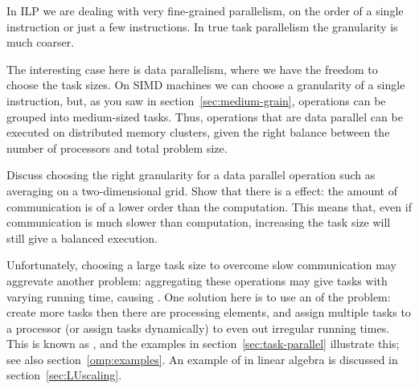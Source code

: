 In \ac{ILP} we are dealing with very fine-grained parallelism, on the
order of a single instruction or just a few instructions. In true task
parallelism the granularity is much coarser.

The interesting case here is data parallelism, where we have the
freedom to choose the task sizes. On \ac{SIMD} machines we can choose
a granularity of a single instruction, but, as you saw in
section~\ref{sec:medium-grain}, operations can be grouped into
medium-sized tasks. Thus, operations that are data parallel can be
executed on distributed memory clusters, given the right balance
between the number of processors and total problem size.

\begin{exercise}
  Discuss choosing the right granularity for a data parallel operation
  such as averaging on a two-dimensional grid. Show that there is a
   effect: the amount of communication is
  of a lower order than the computation. This means that, even if
  communication is much slower than computation, increasing the task
  size will still give a balanced execution.
\end{exercise}

Unfortunately, choosing a large task size to overcome slow
communication may aggrevate another problem: aggregating these
operations may give tasks with varying running time, causing
.  One solution here is to use an
 of the problem: create more tasks then
there are processing elements, and assign multiple tasks to a
processor (or assign tasks dynamically) to even out irregular running
times. This is known as ,
and the examples in section~\ref{sec:task-parallel} illustrate this;
see also section~\ref{omp:examples}.
An example of  in linear algebra is
discussed in section~\ref{sec:LUscaling}.

